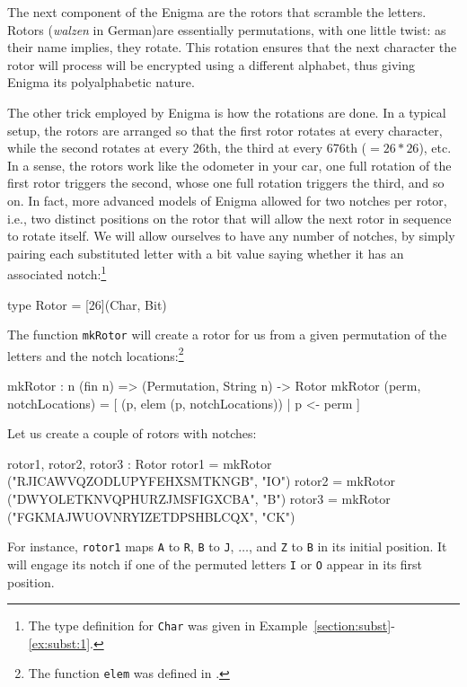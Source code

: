The next component of the Enigma are the rotors that scramble the
letters.  Rotors (\textit{walzen} in German)\indEnigmaRotor are
essentially permutations, with one little twist: as their name
implies, they rotate. This rotation ensures that the next character
the rotor will process will be encrypted using a different alphabet,
thus giving Enigma its polyalphabetic nature.\indPolyAlphSubst

The other trick employed by Enigma is how the rotations are done. In a
typical setup, the rotors are arranged so that the first rotor rotates
at every character, while the second rotates at every 26th, the third
at every 676th ($=26*26$), etc. In a sense, the rotors work like the
odometer in your car, one full rotation of the first rotor triggers
the second, whose one full rotation triggers the third, and so on. In
fact, more advanced models of Enigma allowed for two notches per
rotor, i.e., two distinct positions on the rotor that will allow the
next rotor in sequence to rotate itself. We will allow ourselves to
have any number of notches, by simply pairing each substituted letter
with a bit value saying whether it has an associated
notch:\footnote{The type definition for {\tt Char} was given in
  Example~\ref{section:subst}-\ref{ex:subst:1}.}

\begin{code}
  type Rotor = [26](Char, Bit)
\end{code}
The function {\tt mkRotor} will create a rotor for us from a given permutation of the letters and the notch
locations:\footnote{The function {\tt elem} was defined in .\indElem}
\begin{code}
  mkRotor : {n} (fin n) => (Permutation, String n) -> Rotor
  mkRotor (perm, notchLocations) = [ (p, elem (p, notchLocations))
                                   | p <- perm
                                   ]
\end{code}
Let us create a couple of rotors with notches:
\begin{code}
  rotor1, rotor2, rotor3 : Rotor
  rotor1 = mkRotor ("RJICAWVQZODLUPYFEHXSMTKNGB", "IO")
  rotor2 = mkRotor ("DWYOLETKNVQPHURZJMSFIGXCBA", "B")
  rotor3 = mkRotor ("FGKMAJWUOVNRYIZETDPSHBLCQX", "CK")
\end{code}
For instance, {\tt rotor1} maps {\tt A} to {\tt R}, {\tt B} to {\tt J},
$\ldots$, and {\tt Z} to {\tt B} in its initial position. It will engage its
notch if one of the permuted letters {\tt I} or {\tt O} appear in its first
position.


